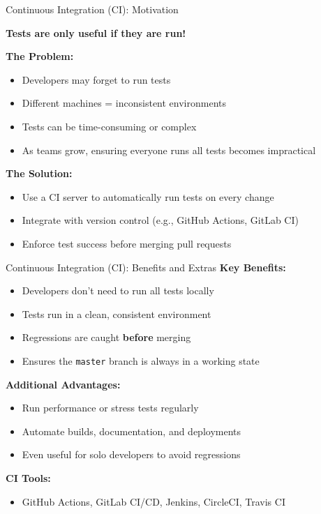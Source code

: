 \begin{frame}{Continuous Integration (CI): Motivation}
	
	\textbf{Tests are only useful if they are run!}
	
	\vspace{1em}
	\textbf{The Problem:}
	\begin{itemize}
		\item Developers may forget to run tests
		\item Different machines = inconsistent environments
		\item Tests can be time-consuming or complex
		\item As teams grow, ensuring everyone runs all tests becomes impractical
	\end{itemize}
	\pause
	\vspace{1em}
	\textbf{The Solution:}
	\begin{itemize}
		\item Use a CI server to automatically run tests on every change
		\item Integrate with version control (e.g., GitHub Actions, GitLab CI)
		\item Enforce test success before merging pull requests
	\end{itemize}
	
\end{frame}

\begin{frame}{Continuous Integration (CI): Benefits and Extras}
	\textbf{Key Benefits:}
	\begin{itemize}
		\item Developers don’t need to run all tests locally
		\item Tests run in a clean, consistent environment
		\item Regressions are caught \textbf{before} merging
		\item Ensures the \texttt{master} branch is always in a working state
	\end{itemize}
	
	\vspace{0.5em}
	\textbf{Additional Advantages:}
	\begin{itemize}
		\item Run performance or stress tests regularly
		\item Automate builds, documentation, and deployments
		\item Even useful for solo developers to avoid regressions
	\end{itemize}
	
	\vspace{0.5em}
	\textbf{CI Tools:}
	\begin{itemize}
		\item GitHub Actions, GitLab CI/CD, Jenkins, CircleCI, Travis CI
	\end{itemize}
	
\end{frame}

